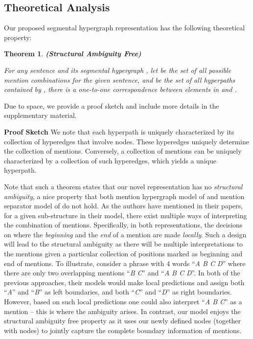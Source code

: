 \documentclass[11pt,a4paper]{article}
\theoremstyle{theorem}
\newtheorem{theorem}{Theorem}[section]
\begin{document}
\subsection*{Theoretical Analysis}



Our proposed segmental hypergraph representation has the following theoretical property:
\theoremstyle{theorem}
\begin{theorem}
{\bf (Structural Ambiguity Free)} 

For any sentence and its segmental hypergraph , let  be the set of all possible mention combinations for the given sentence, and  be the set of all hyperpaths contained by , there is a one-to-one correspondence between elements in  and .


\end{theorem}

Due to space, we provide a proof sketch and include more details in the supplementary material.

\noindent \textbf{Proof Sketch}
{\color{black}
We note that each hyperpath is uniquely characterized by its collection of hyperedges that involve  nodes. These hyperedges uniquely determine the collection of mentions. Conversely, a collection of mentions can be uniquely characterized by a collection of such hyperedges, which yields a unique hyperpath.
}


Note that such a theorem states that our novel representation has no {\em structural ambiguity}, 
a nice property that both mention hypergraph model of \cite{lu2015joint} and mention separator model of \cite{muis2017labeling} do not hold. 
As the authors have mentioned in their papers, for a given sub-structure in their model, there exist multiple ways of interpreting the combination of mentions.
Specifically, in both representations, the decisions on where the {\em beginning} and the {\em end} of a mention are made {\em locally}.
Such a design will lead to the structural ambiguity as there will be multiple interpretations to the mentions given a particular collection of positions marked as beginning and end of mentions.
To illustrate, consider a phrase with 4 words ``{\em A B C D}'' where there are only two overlapping mentions ``{\em B C}'' and ``{\em A B C D}''.
In both of the previous approaches, their models would make local predictions and assign both ``{\em A}'' and ``{\em B}'' as left boundaries, and both ``{\em C}'' and ``{\em D}'' as right boundaries. 
However, based on such local predictions one could also interpret ``{\em A B C}'' as a mention -- this is where the ambiguity arises.
In contrast, our model enjoys the structural ambiguity free property as it uses our newly defined  nodes (together with  nodes) to jointly capture the complete boundary information of mentions.
\end{document}
